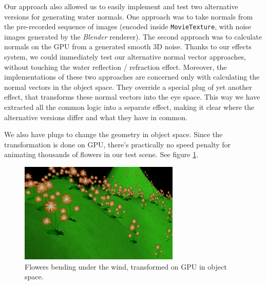 \documentclass{egpubl}
\begin{document}
Our approach also allowed us to easily implement and test
two alternative versions for generating water normals.
One approach was to take normals from the pre-recorded sequence of images
(encoded inside \texttt{MovieTexture},
with noise images generated by the \emph{Blender} renderer).
The second approach was to calculate normals on the GPU from
a generated smooth 3D noise. Thanks to our effects system,
we could immediately test our alternative normal vector approaches,
without touching the water reflection / refraction effect.
Moreover, the implementations of these two approaches are concerned
only with calculating the normal vectors in the object space.
They override a special plug of yet another effect, that transforms
these normal vectors into the eye space.
This way we have extracted all the common logic into a separate effect,
making it clear where the alternative versions differ and what they have
in common.


We also have plugs to change the geometry in object space.
Since the transformation is done on GPU, there's practically
no speed penalty for animating thousands of flowers in our test scene.
See figure \ref{fig_flowers}.

\setcounter{figure}{9}
\begin{figure}[H]
  \centering
  \includegraphics[width=3in]{flowers}
  \caption{Flowers bending under the wind, transformed on GPU in object space.}
  \label{fig_flowers}
\end{figure}
\end{document}
